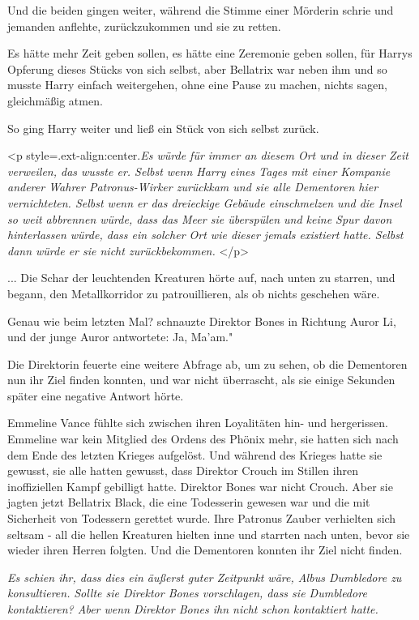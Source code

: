 Und die beiden gingen weiter, während die Stimme einer Mörderin schrie und
jemanden anflehte, zurückzukommen und sie zu retten.

Es hätte mehr Zeit geben sollen, es hätte eine Zeremonie geben sollen, für
Harrys Opferung dieses Stücks von sich selbst, aber Bellatrix war neben ihm und
so musste Harry einfach weitergehen, ohne eine Pause zu machen, nichts sagen,
gleichmäßig atmen.

So ging Harry weiter und ließ ein Stück von sich selbst zurück.

<p style=\grqq{}.ext-align:center\grqq{}.\emph{Es würde für immer an diesem Ort
und in dieser Zeit verweilen, das wusste er. Selbst wenn Harry eines Tages mit
einer Kompanie anderer Wahrer Patronus-Wirker zurückkam und sie alle Dementoren
hier vernichteten. Selbst wenn er das dreieckige Gebäude einschmelzen und die
Insel so weit abbrennen würde, dass das Meer sie überspülen und keine Spur davon
hinterlassen würde, dass ein solcher Ort wie dieser jemals existiert hatte.
Selbst dann würde er sie nicht zurückbekommen. }</p>


... Die Schar der leuchtenden Kreaturen hörte auf, nach unten zu starren, und
begann, den Metallkorridor zu patrouillieren, als ob nichts geschehen wäre.

\glqq Genau wie beim letzten Mal?\grqq{} schnauzte Direktor Bones in Richtung
Auror Li, und der junge Auror antwortete: \glqq Ja, Ma'am."

Die Direktorin feuerte eine weitere Abfrage ab, um zu sehen, ob die Dementoren
nun ihr Ziel finden konnten, und war nicht überrascht, als sie einige Sekunden
später eine negative Antwort hörte.

Emmeline Vance fühlte sich zwischen ihren Loyalitäten hin- und hergerissen.
Emmeline war kein Mitglied des Ordens des Phönix mehr, sie hatten sich nach dem
Ende des letzten Krieges aufgelöst. Und während des Krieges hatte sie gewusst,
sie alle hatten gewusst, dass Direktor Crouch im Stillen ihren inoffiziellen
Kampf gebilligt hatte. Direktor Bones war nicht Crouch. Aber sie jagten jetzt
Bellatrix Black, die eine Todesserin gewesen war und die mit Sicherheit von
Todessern gerettet wurde. Ihre Patronus Zauber verhielten sich seltsam - all die
hellen Kreaturen hielten inne und starrten nach unten, bevor sie wieder ihren
Herren folgten. Und die Dementoren konnten ihr Ziel nicht finden.

\emph{Es schien ihr, dass dies ein äußerst guter Zeitpunkt wäre, Albus
Dumbledore zu konsultieren.} \emph{Sollte sie Direktor Bones vorschlagen, dass
sie Dumbledore kontaktieren? Aber wenn Direktor Bones ihn nicht schon
kontaktiert hatte.}

